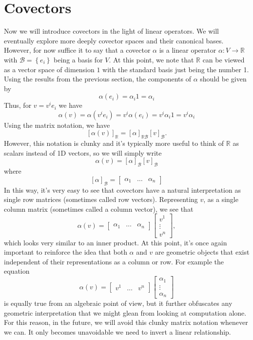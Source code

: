 \documentclass[a4paper]{article}
\begin{document}
\section*{Covectors}%
Now we will introduce covectors in the light of linear operators. We will eventually explore more deeply covector spaces and their canonical bases. However, for now suffice it to say that a covector $\alpha$ is a linear operator $\alpha: V \rightarrow \mathds{R}$ with $\mathcal{B} = \left\{ e_i \right\}$ being a basis for $V$. At this point, we note that $\mathds{R}$ can be viewed as a vector space of dimension $1$ with the standard basis just being the number 1. Using the results from the previous section, the components of $\alpha$ should be given by
\[
  \alpha(e_i) = \alpha_i 1 = \alpha_i
\]
Thus, for $v = v^i e_i$ we have
\[
  \alpha(v) = \alpha(v^ie_i) = v^i\alpha(e_i) = v^i \alpha_i 1 = v^i \alpha_i
\]
Using the matrix notation, we have
\[
  [\alpha(v)]_{\mathds{R}} = \left[ \alpha \right]_{\mathds{R} \mathcal{B}} \left[  v\right]_{\mathcal{B}}.
\]
However, this notation is clunky and it's typically more useful to think of $\mathds{R}$ as scalars instead of 1D vectors, so we will simply write
\[
  \alpha(v) = \left[ \alpha \right]_{\mathcal{B}} \left[  v\right]_{\mathcal{B}}
\]
where
\[
  \left[ \alpha \right]_{\mathcal{B}} =  
  \begin{bmatrix}
    \alpha_1 & \dots & \alpha_n
  \end{bmatrix}
\]
In this way, it's very easy to see that covectors have a natural interpretation as single row matrices (sometimes called row vectors). Representing $v$, as a single column matrix (sometimes called a column vector), we see that
\[
  \alpha(v) = 
  \begin{bmatrix}
    \alpha_1 & \dots & \alpha_n
  \end{bmatrix}
  \begin{bmatrix}
    v^1 \\
    \vdots \\
    v^n
  \end{bmatrix},
\]
which looks very similar to an inner product. At this point, it's once again important to reinforce the idea that both $\alpha$ and $v$ are geometric objects that exist independent of their representations as a column or row. For example the equation
\[
  \alpha(v) = 
  \begin{bmatrix}
    v^1 & \dots & v^n
  \end{bmatrix}
  \begin{bmatrix}
    \alpha_1 \\
    \vdots \\
    \alpha_n
  \end{bmatrix}
\]
is equally true from an algebraic point of view, but it further obfuscates any geometric interpretation that we might glean from looking at computation alone. For this reason, in the future, we will avoid this clunky matrix notation whenever we can. It only becomes unavoidable we need to invert a linear relationship.
\end{document}
